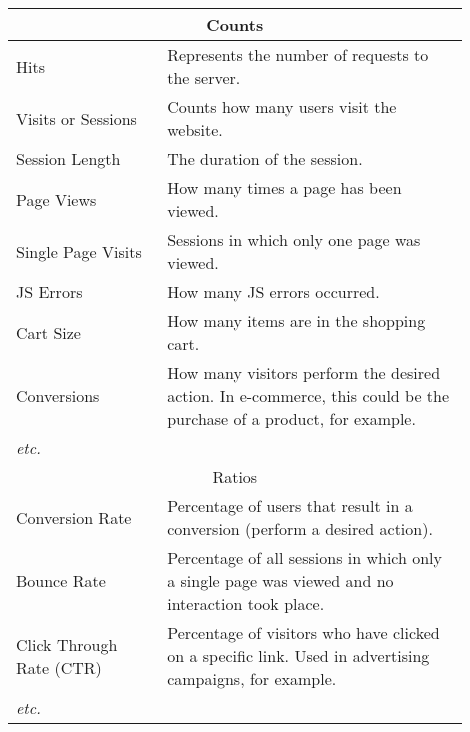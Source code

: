 \begin{center}
	\small
	\begin{longtable}{ | p{0.3\linewidth} | p{0.6\linewidth} | }
	
	\hline
	\multicolumn{2}{|c|}{ \cellcolor{lightgrey} Counts} \\
	\hline
	Hits & Represents the number of requests to the server. \\ %
	\hline
	Visits or Sessions & Counts how many users visit the website. \\ %
	\hline
	Session Length & The duration of the session. \\ %
	\hline
	Page Views & How many times a page has been viewed. \\ %
	\hline
	Single Page Visits & Sessions in which only one page was viewed. \\ %
	\hline
	JS Errors & How many JS errors occurred. \\
	\hline
	Cart Size & How many items are in the shopping cart. \\
	\hline
	Conversions & How many visitors perform the desired action. In e-commerce, this could be the purchase of a product, for example. \\
	\hline
	\textit{etc.} &  \\

	\hline
	\multicolumn{2}{|c|}{ \cellcolor{lightgrey} Ratios} \\
	\hline
	Conversion Rate & Percentage of users that result in a conversion (perform a desired action). \\
	\hline
	Bounce Rate & Percentage of all sessions in which only a single page was viewed and no interaction took place. \\
	\hline
	Click Through Rate (CTR) & Percentage of visitors who have clicked on a specific link. Used in advertising campaigns, for example. \\
	\hline
	\textit{etc.} & \\	
	

\end{longtable}
\end{center}
